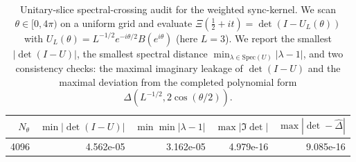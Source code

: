 \begin{table}[H]
\centering
\scriptsize
\setlength{\tabcolsep}{6pt}
\caption{Unitary-slice spectral-crossing audit for the weighted sync-kernel. We scan $\theta\in[0,4\pi)$ on a uniform grid and evaluate $\Xi(\tfrac12+it)=\det(I-U_L(\theta))$ with $U_L(\theta)=L^{-1/2}e^{-i\theta/2}B(e^{i\theta})$ (here $L=3$). We report the smallest $|\det(I-U)|$, the smallest spectral distance $\min_{\lambda\in\mathrm{Spec}(U)}|\lambda-1|$, and two consistency checks: the maximal imaginary leakage of $\det(I-U)$ and the maximal deviation from the completed polynomial form $\widehat\Delta(L^{-1/2},2\cos(\theta/2))$.}
\label{tab:sync_kernel_unitary_slice_spectral_crossing}
\begin{tabular}{r r r r r}
\toprule
$N_\theta$ & $\min|\det(I-U)|$ & $\min\min|\lambda-1|$ & $\max|\Im\det|$ & $\max|\det-\widehat\Delta|$\\
\midrule
4096 & 4.562e-05 & 3.162e-05 & 4.979e-16 & 9.085e-16\\
\bottomrule
\end{tabular}
\end{table}
